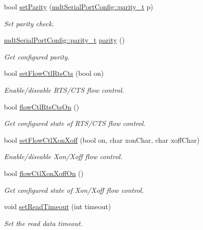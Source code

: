 \begin{DoxyCompactItemize}
bool \hyperlink{classmdt_serial_port_ae435f052a87dcd0b1829f1577bb5e58d}{set\-Parity} (\hyperlink{classmdt_serial_port_config_a4b9e444637cf0193a125fabdd67d8bfe}{mdt\-Serial\-Port\-Config\-::parity\-\_\-t} p)
\begin{DoxyCompactList}\small\item\em Set parity check. \end{DoxyCompactList}\item 
\hyperlink{classmdt_serial_port_config_a4b9e444637cf0193a125fabdd67d8bfe}{mdt\-Serial\-Port\-Config\-::parity\-\_\-t} \hyperlink{classmdt_serial_port_a98938e2c51d1888236b920903f99050a}{parity} ()
\begin{DoxyCompactList}\small\item\em Get configured parity. \end{DoxyCompactList}\item 
bool \hyperlink{classmdt_serial_port_a175785be0dfe124254484822b7b8832e}{set\-Flow\-Ctl\-Rts\-Cts} (bool on)
\begin{DoxyCompactList}\small\item\em Enable/diseable R\-T\-S/\-C\-T\-S flow control. \end{DoxyCompactList}\item 
bool \hyperlink{classmdt_serial_port_a9315ed0c7854a09716a4585efb0094c7}{flow\-Ctl\-Rts\-Cts\-On} ()
\begin{DoxyCompactList}\small\item\em Get configured state of R\-T\-S/\-C\-T\-S flow control. \end{DoxyCompactList}\item 
bool \hyperlink{classmdt_serial_port_a34e2ac7b0d3cb7a6fb65756cbca2ce48}{set\-Flow\-Ctl\-Xon\-Xoff} (bool on, char xon\-Char, char xoff\-Char)
\begin{DoxyCompactList}\small\item\em Enable/diseable Xon/\-Xoff flow control. \end{DoxyCompactList}\item 
bool \hyperlink{classmdt_serial_port_a8d3e3eb1d2272129b8b97377dff1d5d4}{flow\-Ctl\-Xon\-Xoff\-On} ()
\begin{DoxyCompactList}\small\item\em Get configured state of Xon/\-Xoff flow control. \end{DoxyCompactList}\item 
void \hyperlink{classmdt_serial_port_a9105e5a3a640b56097c1156000ace933}{set\-Read\-Timeout} (int timeout)
\begin{DoxyCompactList}\small\item\em Set the read data timeout. \end{DoxyCompactList}\item 

\end{DoxyCompactItemize}
